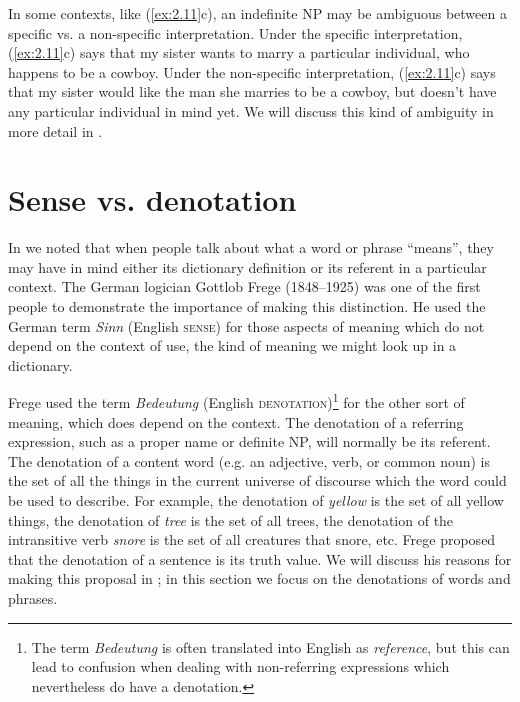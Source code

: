 In some contexts, like (\ref{ex:2.11}c), an indefinite NP may be ambiguous between a specific vs. a non-specific interpretation. Under the specific interpretation, (\ref{ex:2.11}c) says that my sister wants to marry a particular individual, who happens to be a cowboy. Under the non-specific interpretation, (\ref{ex:2.11}c) says that my sister would like the man she marries to be a cowboy, but doesn’t have any particular individual in mind yet. We will discuss this kind of ambiguity in more detail in .


\section{Sense vs. denotation}\label{sec:} %

In  we noted that when people talk about what a word or phrase “means”, they may have in mind either its dictionary definition or its referent in a particular context. The German logician Gottlob Frege (1848–1925) was one of the first people to demonstrate the importance of making this distinction. He used the German term \textit{Sinn} (English \textsc{sense}) for those aspects of meaning which do not depend on the context of use, the kind of meaning we might look up in a dictionary.



Frege used the term \textit{Bedeutung} (English \textsc{denotation})\footnote{The term \textit{Bedeutung} is often translated into English as \textit{reference}, but this can lead to confusion when dealing with non-referring expressions which nevertheless do have a denotation.} for the other sort of meaning, which does depend on the context. The denotation of a referring expression, such as a proper name or definite NP, will normally be its referent. The denotation of a content word (e.g. an adjective, verb, or common noun) is the set of all the things in the current universe of discourse which the word could be used to describe. For example, the denotation of \textit{yellow} is the set of all yellow things, the denotation of \textit{tree} is the set of all trees, the denotation of the intransitive verb \textit{snore} is the set of all creatures that snore, etc. Frege proposed that the denotation of a sentence is its truth value. We will discuss his reasons for making this proposal in ; in this section we focus on the denotations of words and phrases.



